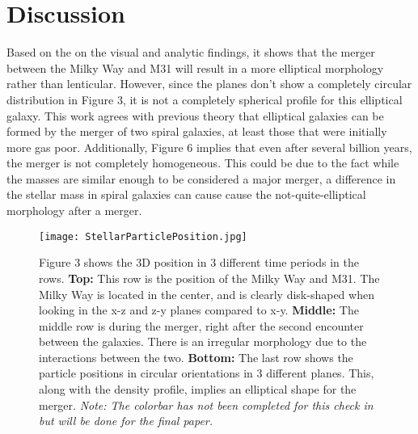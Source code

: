 \documentclass[twocolumn]{aastex63}
\begin{document}
\section{Discussion}
Based on the on the visual and analytic findings, it shows that the merger between the Milky Way and M31 will result in a more elliptical morphology rather than lenticular. However, since the planes don't show a completely circular distribution in Figure 3, it is not a completely spherical profile for this elliptical galaxy. This work agrees with previous theory that elliptical galaxies can be formed by the merger of two spiral galaxies, at least those that were initially more gas poor. Additionally, Figure 6 implies that even after several billion years, the merger is not completely homogeneous. This could be due to the fact while the masses are similar enough to be considered a major merger, a difference in the stellar mass in spiral galaxies can cause cause the not-quite-elliptical morphology after a merger. 

{}


 \begin{figure}[h]
    \centering
    \texttt{[image: StellarParticlePosition.jpg]}
    \caption{Figure 3 shows the 3D position in 3 different time periods in the rows. \textbf{Top:} This row is the position of the Milky Way and M31. The Milky Way is located in the center, and is clearly disk-shaped when looking in the x-z and z-y planes compared to x-y. \textbf{Middle:} The middle row is during the merger, right after the second encounter between the galaxies. There is an irregular morphology due to the interactions between the two. \textbf{Bottom:} The last row shows the particle positions in circular orientations in 3 different planes. This, along with the density profile, implies an elliptical shape for the merger. \textit{Note: The colorbar has not been completed for this check in but will be done for the final paper.} }
    \label{fig:fig_3}
\end{figure}
\end{document}

